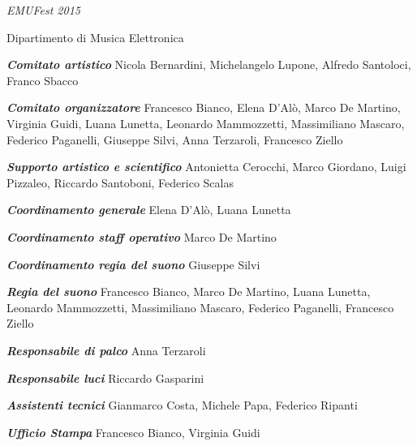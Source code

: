 

%
%
	
{\fontsize{24}{22} \textit{EMUFest 2015}}

\medskip

{\fontsize{12}{12} \textsf{Dipartimento di Musica Elettronica}}

\vspace{.5cm}

\textbf{\textit{Comitato artistico}}
Nicola Bernardini, Michelangelo Lupone, Alfredo Santoloci, Franco Sbacco

\medskip

\textbf{\textit{Comitato organizzatore}}
Francesco Bianco, Elena D’Alò, Marco De Martino, Virginia Guidi, Luana Lunetta, Leonardo Mammozzetti, Massimiliano Mascaro, Federico Paganelli, Giuseppe Silvi, Anna Terzaroli, Francesco Ziello  

\medskip

\textbf{\textit{Supporto artistico e scientifico}}
Antonietta Cerocchi, Marco Giordano, Luigi Pizzaleo, Riccardo Santoboni, Federico Scalas

\medskip

\textbf{\textit{Coordinamento generale}}
Elena D’Alò, Luana Lunetta

\medskip

\textbf{\textit{Coordinamento staff operativo}}
Marco De Martino

\medskip

\textbf{\textit{Coordinamento regia del suono}}
Giuseppe Silvi

\medskip

\textbf{\textit{Regia del suono}}
Francesco Bianco, Marco De Martino, Luana Lunetta, Leonardo Mammozzetti, Massimiliano Mascaro, Federico Paganelli, Francesco Ziello

\medskip

\textbf{\textit{Responsabile di palco}}
Anna Terzaroli

\medskip

\textbf{\textit{Responsabile luci}}
Riccardo Gasparini

\medskip

\textbf{\textit{Assistenti tecnici}}
Gianmarco Costa, Michele Papa, Federico Ripanti

\textbf{\textit{Ufficio Stampa}}
Francesco Bianco, Virginia Guidi

